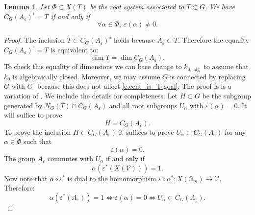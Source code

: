 \documentclass[12pt]{amsart}
\numberwithin{equation}{section}
\newtheorem{lemma}[theorem]{Lemma}
\theoremstyle{definition}
\newcommand{\cV}{\mathcal{V}}
\newcommand{\Gm}{\mathbb{G}_m}
\newcommand{\alg}{\operatorname{alg}}
\newcommand{\eps}{\varepsilon}
\begin{document}
\begin{lemma}\label{lem.cent_is_T}
    Let $\Phi \subset X(T)$ be the root system associated to $T\subset G$.
    We have $C_G(A_\eps)^{\circ}=T$ if and only if 
    \begin{equation}\label{e.31}
    \forall \alpha\in \Phi, \ \eps(\alpha)\neq 0.
    \end{equation}
\end{lemma}
\begin{proof}
   The inclusion $T\subset C_G(A_\eps)^{\circ}$ holds because $A_\eps\subset T$. Therefore the equality $C_G(A_\eps)^{\circ}=T$ is equivalent to:
   \begin{equation}\label{e.cent_is_T-goal}
       \dim T = \dim C_G(A_\eps).
   \end{equation}
   To check this equality of dimensions we can base change to $k_{0,\alg}$ to assume that $k_0$ is algebraically closed. Moreover, we may assume $G$ is connected by replacing $G$ with $G^{\circ}$ because this does not affect \eqref{e.cent_is_T-goal}.
   The proof is is a variation of \cite[Theorem 2.2]{humphreys1995conjugacy}. We include the details for completeness. Let $H\subset G$ be the subgroup generated by $N_G(T)\cap C_G(A_\eps)$ and all root subgroups $U_\alpha$ with $\eps(\alpha) =0$. It will suffice to prove $$H= C_G(A_\eps).$$
    To prove the inclusion $H\subset C_G(A_\eps)$ it suffices to prove $U_\alpha\subset C_G(A_\eps)$ for any $\alpha\in \Phi$ such that $$\eps(\alpha)=0.$$
    The group $A_\eps$ commutes with $U_\alpha$ if and only if
    $$\alpha(\eps^*(X(\cV))) =1.$$
    Now note that $\alpha \circ \eps^*$ is dual to the homomorphism $\eps \circ \alpha^* : X(\Gm) \to \cV$. Therefore: 
    \begin{equation}\label{e.41}
        \alpha(\eps^*(A_\eps)) =1\iff \eps(\alpha)= 0 \iff U_\alpha \subset C_G(A_\eps).
    \end{equation}


\end{proof}
\end{document}
